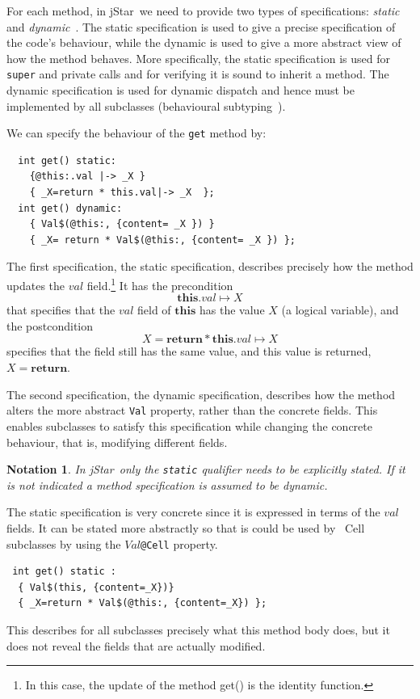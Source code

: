 \documentclass[11pt]{article}
\newcommand{\jStar}{{\sf jStar}}
\newcommand{\this}{\mathbf{this}}
\newcommand{\return}{\mathbf{return}}
\newtheorem{notation}{Notation}
\def\J{\lstinline}
\newcommand{\JS}[1]{$\mathit{#1}$}
\begin{document}
For each method, in \jStar \ we need to provide two types of specifications: {\em static}
and {\em dynamic}~\cite{PB08,chin08}.  The static specification is
used to give a precise specification of the code's behaviour, while the
dynamic is used to give a more abstract view of how the method
behaves.  More specifically, the static specification is used for
\J~super~ and private calls and for verifying it is sound to inherit a
method.  The dynamic specification is used for dynamic dispatch
and hence must be implemented by all subclasses (behavioural
subtyping~\cite{liskov94}).

We can  specify the behaviour of the \J~get~ method by:
\begin{verbatim}
  int get() static:
    {@this:.val |-> _X }
    { _X=return * this.val|-> _X  };
  int get() dynamic:
    { Val$(@this:, {content= _X }) } 
    { _X= return * Val$(@this:, {content= _X }) };
\end{verbatim}
%
The first specification, the static specification, describes precisely
how the method updates the \JS{val} field.\footnote{In this case, the
  update of the method get() is the identity function.}  It has the
precondition $$\this.val \mapsto X$$ that specifies that the \JS{val}
field of $\this$ has the value \JS{X} (a logical
variable), and
the postcondition $$X=\return * \this.val \mapsto X$$ specifies that the
field still has the same value, and this value is returned,
$X=\return$.

The second specification, the dynamic specification, describes how the
method alters the more abstract \J~Val~ property, rather than the
concrete fields.  This enables subclasses to satisfy this
specification while changing the concrete behaviour, that is,
modifying different fields.

\begin{notation}
In \jStar \ only the {\tt static}
  qualifier needs to be explicitly stated. If it is not indicated 
  a method specification is assumed to be dynamic.
\end{notation}


The static specification is very concrete since it is expressed in terms of the 
$val$ fields.  It can be stated more abstractly so that is could be used by \JS~Cell~ 
subclasses  by using the \JS{Val}\J~@Cell~ property.
\begin{verbatim}
 int get() static : 
  { Val$(this, {content=_X})} 
  { _X=return * Val$(@this:, {content=_X}) };
 \end{verbatim}
This describes for all subclasses precisely what this method body
does, but it does not reveal the fields that are actually modified.
\end{document}
